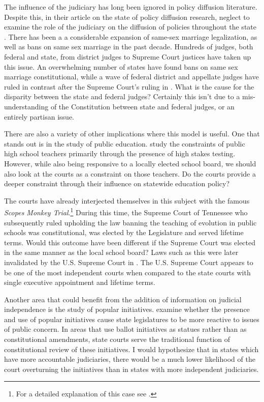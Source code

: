 \documentclass[12pt]{article}
\begin{document}
The influence of the judiciary has long been ignored in policy diffusion literature.  Despite this, in their article on the state of policy diffusion research, \citeauthor{graham2013diffusion} neglect to examine the role of the judiciary on the diffusion of policies throughout the state \citep{graham2013diffusion}.  There has been a a considerable expansion of same-sex marriage legalization, as well as bans on same sex marriage in the past decade.  Hundreds of judges, both federal and state, from district judges to Supreme Court justices have taken up this issue.  An overwhelming number of states have found bans on same sex marriage constitutional, while a wave of federal district and appellate judges have ruled in contrast after the Supreme Court's ruling in \cite{windsor}.  What is the cause for the disparity between the state and federal judges? Certainly this isn't due to a mis-understanding of the Constitution between state and federal judges, or an entirely partisan issue.   

There are also a variety of other implications where this model is useful.  One that stands out is in the study of public education.  \citet{berkman2011local} study the constraints of public high school teachers primarily through the presence of high stakes testing.  However, while also being responsive to a locally elected school board, we should also look at the courts as a constraint on those teachers.  Do the courts provide a deeper constraint through their influence on statewide education policy?

The courts have already interjected themselves in this subject with the famous \textit{Scopes Monkey Trial}.\footnote{For a detailed explanation of this case see \citet{ray1958six}.}  During this time, the Supreme Court of Tennessee who subsequently ruled upholding the law banning the teaching of evolution in public schools was constitutional, was elected by the Legislature and served lifetime terms.  Would this outcome have been different if the Supreme Court was elected in the same manner as the local school board? Laws such as this were later invalidated by the U.S. Supreme Court in \cite{epperson}.  The U.S. Supreme Court appears to be one of the most independent courts when compared to the state courts with single executive appointment and lifetime terms.

Another area that could benefit from the addition of information on judicial independence is the study of popular initiatives.  \citet{lascher1996gun} examine whether the presence and use of popular initiatives cause state legislatures to be more reactive to issues of public concern.  In areas that use ballot initiatives as statues rather than as constitutional amendments, state courts serve the traditional function of constitutional review of these initiatives.  I would hypothesize that in states which have more accountable judiciaries, there would be a much lower likelihood of the court overturning the initiatives than in states with more independent judiciaries.  
\end{document}
